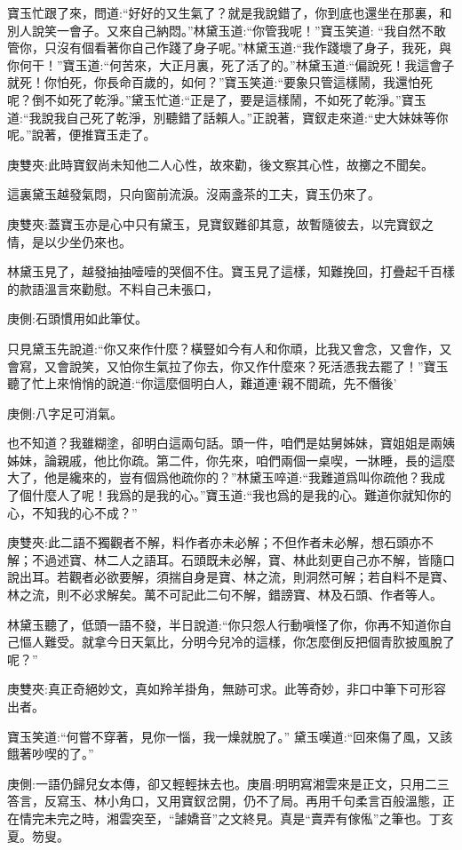 \begin{parag}
    寶玉忙跟了來，問道:“好好的又生氣了？就是我說錯了，你到底也還坐在那裏，和別人說笑一會子。又來自己納悶。”林黛玉道:“你管我呢！”寶玉笑道: “我自然不敢管你，只沒有個看著你自己作踐了身子呢。”林黛玉道:“我作踐壞了身子，我死，與你何干！”寶玉道:“何苦來，大正月裏，死了活了的。”林黛玉道:“偏說死！我這會子就死！你怕死，你長命百歲的，如何？”寶玉笑道:“要象只管這樣鬧，我還怕死呢？倒不如死了乾淨。”黛玉忙道:“正是了，要是這樣鬧，不如死了乾淨。”寶玉道:“我說我自己死了乾淨，別聽錯了話賴人。”正說著，寶釵走來道:“史大妹妹等你呢。”說著，便推寶玉走了。\begin{note}庚雙夾:此時寶釵尚未知他二人心性，故來勸，後文察其心性，故擲之不聞矣。\end{note}這裏黛玉越發氣悶，只向窗前流淚。沒兩盞茶的工夫，寶玉仍來了。\begin{note}庚雙夾:蓋寶玉亦是心中只有黛玉，見寶釵難卻其意，故暫隨彼去，以完寶釵之情，是以少坐仍來也。\end{note}林黛玉見了，越發抽抽噎噎的哭個不住。寶玉見了這樣，知難挽回，打疊起千百樣的款語溫言來勸慰。不料自己未張口，\begin{note}庚側:石頭慣用如此筆仗。\end{note}只見黛玉先說道:“你又來作什麼？橫豎如今有人和你頑，比我又會念，又會作，又會寫，又會說笑，又怕你生氣拉了你去，你又作什麼來？死活憑我去罷了！”寶玉聽了忙上來悄悄的說道:“你這麼個明白人，難道連‘親不間疏，先不僭後’\begin{note}庚側:八字足可消氣。\end{note}也不知道？我雖糊塗，卻明白這兩句話。頭一件，咱們是姑舅姊妹，寶姐姐是兩姨姊妹，論親戚，他比你疏。第二件，你先來，咱們兩個一桌喫，一牀睡，長的這麼大了，他是纔來的，豈有個爲他疏你的？”林黛玉啐道:“我難道爲叫你疏他？我成了個什麼人了呢！我爲的是我的心。”寶玉道:“我也爲的是我的心。難道你就知你的心，不知我的心不成？”\begin{note}庚雙夾:此二語不獨觀者不解，料作者亦未必解；不但作者未必解，想石頭亦不解；不過述寶、林二人之語耳。石頭既未必解，寶、林此刻更自己亦不解，皆隨口說出耳。若觀者必欲要解，須揣自身是寶、林之流，則洞然可解；若自料不是寶、林之流，則不必求解矣。萬不可記此二句不解，錯謗寶、林及石頭、作者等人。\end{note}林黛玉聽了，低頭一語不發，半日說道:“你只怨人行動嗔怪了你，你再不知道你自己慪人難受。就拿今日天氣比，分明今兒冷的這樣，你怎麼倒反把個青肷披風脫了呢？”\begin{note}庚雙夾:真正奇絕妙文，真如羚羊掛角，無跡可求。此等奇妙，非口中筆下可形容出者。\end{note}寶玉笑道:“何嘗不穿著，見你一惱，我一燥就脫了。” 黛玉嘆道:“回來傷了風，又該餓著吵喫的了。”\begin{note}庚側:一語仍歸兒女本傳，卻又輕輕抹去也。庚眉:明明寫湘雲來是正文，只用二三答言，反寫玉、林小角口，又用寶釵岔開，仍不了局。再用千句柔言百般溫態，正在情完未完之時，湘雲突至，“謔嬌音”之文終見。真是“賣弄有傢俬”之筆也。丁亥夏。笏叟。\end{note}
\end{parag}


